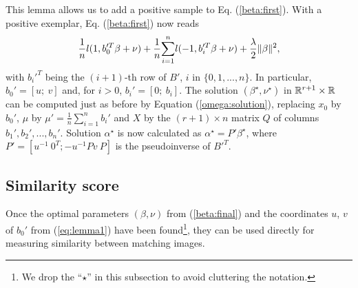 This lemma allows us to add a positive sample to Eq. (\ref{beta:first}).
With a positive exemplar, Eq. (\ref{beta:first}) now reads
\begin{align}
 \dfrac{1}{n}l(1, b_0'^T\beta+\nu) +\dfrac{1}{n}\displaystyle{\sum_{i=1}^n} l(-1,b_i'^T\beta+\nu)
+\dfrac{\lambda}{2}\|\beta\|^2,\label{beta:final}
\end{align}
with $b_i'^T$ being the $(i+1)$-th row of $B'$, $i$ in $\{0,1,...,n\}$. In particular, $b_0'=[u; \ v]$ and, for $i>0$, $b_i'=[0; \ b_i]$. The solution $(\beta^\star,\nu^\star)$ in $\mathbb R^{r+1}\times\mathbb R$ can be computed just as before by Equation (\ref{omega:solution}), replacing $x_0$ by $b_0'$, $\mu$ by $\mu' = \frac{1}{n}\sum_{i=1}^n b_i'$ and $X$ by the $(r+1)\times n$ matrix $Q$ of columns $b_1', b_2',...,b_n'$. Solution $\alpha^\star$ is now calculated as
$\alpha^\star=P'\beta^\star$, where $P' = [u^{-1} \ 0^T; -u^{-1}Pv \ P]$ is the pseudoinverse of $B'^T$. 


\subsection{Similarity score}\label{simi_score}
Once the optimal parameters $(\beta, \nu)$ from (\ref{beta:final}) and the coordinates $u$, $v$ of $b_0'$ from (\ref{eq:lemma1}) have been found\footnote{We drop the ``$\star$'' in this subsection to avoid cluttering the notation.}, they can be used directly for measuring similarity between matching images.

